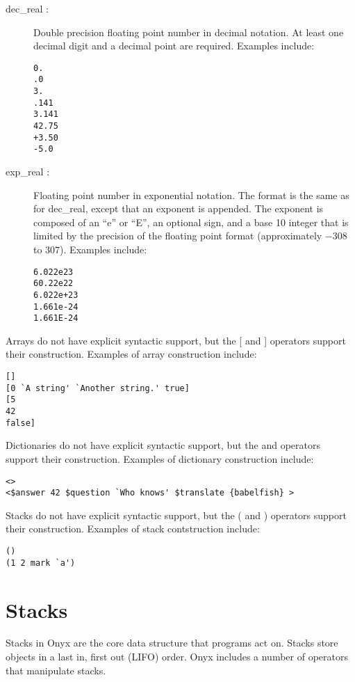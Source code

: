 \begin{description}
\item[{\lt}dec\_real{\gt} : ] Double precision floating point number in decimal
notation.  At least one decimal digit and a decimal point are required.
Examples include:
\begin{verbatim}
0.
.0
3.
.141
3.141
42.75
+3.50
-5.0
\end{verbatim}

\item[{\lt}exp\_real{\gt} : ] Floating point number in exponential notation.
The format is the same as for {\lt}dec\_real{\gt}, except that an exponent is
appended.  The exponent is composed of an ``e'' or ``E'', an optional sign, and
a base 10 integer that is limited by the precision of the floating point format
(approximately $-308$ to $307$).  Examples include:
\begin{verbatim}
6.022e23
60.22e22
6.022e+23
1.661e-24
1.661E-24
\end{verbatim}

\end{description}

Arrays do not have explicit syntactic support, but the [ and ] operators support
their construction.  Examples of array construction include:
\begin{verbatim}
[]
[0 `A string' `Another string.' true]
[5
42
false]
\end{verbatim}

Dictionaries do not have explicit syntactic support, but the {\lt} and
{\gt} operators support their construction.  Examples of dictionary
construction include:
\begin{verbatim}
<>
<$answer 42 $question `Who knows' $translate {babelfish} >
\end{verbatim}

Stacks do not have explicit syntactic support, but the ( and ) operators support
their construction.  Examples of stack contstruction include:
\begin{verbatim}
()
(1 2 mark `a')
\end{verbatim}

\section{Stacks}

Stacks in Onyx are the core data structure that programs act on.  Stacks store
objects in a last in, first out (LIFO) order.  Onyx includes a number of
operators that manipulate stacks.

